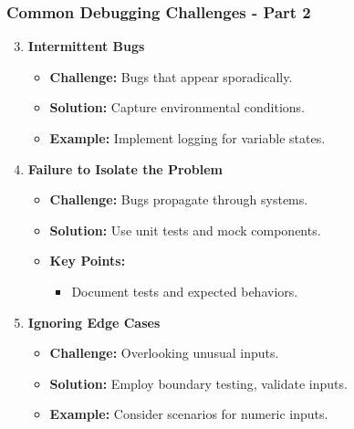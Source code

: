 \documentclass{beamer}
\begin{document}
\begin{frame}[fragile]
    \frametitle{Common Debugging Challenges - Part 2}
    \begin{enumerate}
        \setcounter{enumi}{2}
        \item \textbf{Intermittent Bugs}
            \begin{itemize}
                \item \textbf{Challenge:} Bugs that appear sporadically.
                \item \textbf{Solution:} Capture environmental conditions.
                \item \textbf{Example:} Implement logging for variable states.
            \end{itemize}

        \item \textbf{Failure to Isolate the Problem}
            \begin{itemize}
                \item \textbf{Challenge:} Bugs propagate through systems.
                \item \textbf{Solution:} Use unit tests and mock components.
                \item \textbf{Key Points:}
                    \begin{itemize}
                        \item Document tests and expected behaviors.
                    \end{itemize}
            \end{itemize}

        \item \textbf{Ignoring Edge Cases}
            \begin{itemize}
                \item \textbf{Challenge:} Overlooking unusual inputs.
                \item \textbf{Solution:} Employ boundary testing, validate inputs.
                \item \textbf{Example:} Consider scenarios for numeric inputs.
            \end{itemize}
    \end{enumerate}
\end{frame}
\end{document}
